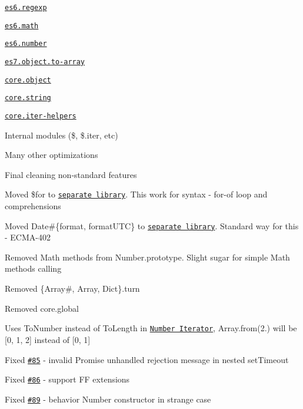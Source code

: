 \begin{DoxyItemize}
\begin{DoxyItemize}
\item \href{https://github.com/zloirock/core-js/#ecmascript-6-regexp}{\tt {\ttfamily es6.\+regexp}}
\item \href{https://github.com/zloirock/core-js/#ecmascript-6-math}{\tt {\ttfamily es6.\+math}}
\item \href{https://github.com/zloirock/core-js/#ecmascript-6-number}{\tt {\ttfamily es6.\+number}}
\item \href{https://github.com/zloirock/core-js/#ecmascript-7-proposals}{\tt {\ttfamily es7.\+object.\+to-\/array}}
\item \href{https://github.com/zloirock/core-js/#object}{\tt {\ttfamily core.\+object}}
\item \href{https://github.com/zloirock/core-js/#escaping-strings}{\tt {\ttfamily core.\+string}}
\item \href{https://github.com/zloirock/core-js/#ecmascript-6-iterators}{\tt {\ttfamily core.\+iter-\/helpers}}
\item Internal modules ({\ttfamily \$}, {\ttfamily \$.iter}, etc)
\end{DoxyItemize}
\item Many other optimizations
\item Final cleaning non-\/standard features
\begin{DoxyItemize}
\item Moved {\ttfamily \$for} to \href{https://github.com/zloirock/forof}{\tt separate library}. This work for syntax -\/ {\ttfamily for-\/of} loop and comprehensions
\item Moved {\ttfamily Date\#\{format, format\+U\+TC\}} to \href{https://github.com/zloirock/dtf}{\tt separate library}. Standard way for this -\/ {\ttfamily E\+C\+M\+A-\/402}
\item Removed {\ttfamily Math} methods from {\ttfamily Number.\+prototype}. Slight sugar for simple {\ttfamily Math} methods calling
\item Removed {\ttfamily \{Array\#, Array, Dict\}.turn}
\item Removed {\ttfamily core.\+global}
\end{DoxyItemize}
\item Uses {\ttfamily To\+Number} instead of {\ttfamily To\+Length} in \href{https://github.com/zloirock/core-js/#number-iterator}{\tt {\ttfamily Number Iterator}}, {\ttfamily Array.\+from(2.)} will be {\ttfamily \mbox{[}0, 1, 2\mbox{]}} instead of {\ttfamily \mbox{[}0, 1\mbox{]}}
\item Fixed \href{https://github.com/zloirock/core-js/issues/85}{\tt \#85} -\/ invalid {\ttfamily Promise} unhandled rejection message in nested {\ttfamily set\+Timeout}
\item Fixed \href{https://github.com/zloirock/core-js/issues/86}{\tt \#86} -\/ support FF extensions
\item Fixed \href{https://github.com/zloirock/core-js/issues/89}{\tt \#89} -\/ behavior {\ttfamily Number} constructor in strange case
\end{DoxyItemize}

